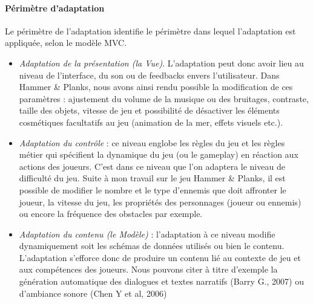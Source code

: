 	\paragraph{Périmètre d'adaptation\\}
Le périmètre de l'adaptation identifie le périmètre dans lequel l'adaptation est appliquée, selon le modèle MVC. 
\begin{itemize}
	\item \emph{Adaptation de la présentation (la Vue)}. L'adaptation peut donc avoir lieu au niveau de l'interface, du son ou de feedbacks envers l'utilisateur. Dans Hammer \& Planks, nous avons ainsi rendu possible la modification de ces paramètres : ajustement du volume de la musique ou des bruitages, contraste, taille des objets, vitesse de jeu et possibilité de désactiver les éléments cosmétiques facultatifs au jeu (animation de la mer, effets visuels etc.).
		\item  \emph{Adaptation du contrôle} : ce niveau englobe les règles du jeu et les règles métier qui spécifient la dynamique du jeu (ou le gameplay) en réaction aux actions des joueurs. C'est dans ce niveau que l'on adaptera le niveau de difficulté du jeu. Suite à mon travail sur le jeu Hammer \& Planks, il est possible de modifier le nombre et le type d'ennemis que doit affronter le joueur, la vitesse du jeu, les propriétés des personnages (joueur ou ennemis) ou encore la fréquence des obstacles par exemple.
		\item  \emph{Adaptation du contenu (le Modèle)} : l'adaptation à ce niveau modifie dynamiquement soit les schémas de données utilisés ou bien le contenu. L'adaptation s'efforce donc de produire un contenu lié au contexte de jeu et aux compétences des joueurs. Nous pouvons citer à titre d'exemple la génération automatique des dialogues et textes narratifs (Barry G., 2007) ou d'ambiance sonore (Chen Y et al, 2006)
\end{itemize} 

